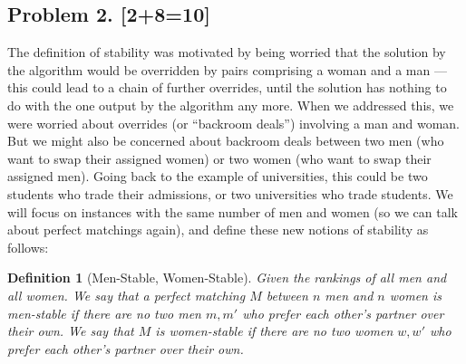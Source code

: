 \documentclass[10pt]{article}
\newtheorem{definition}{Definition}
\begin{document}
\subsection*{Problem 2. [2+8=10]}
  The definition of stability was motivated by being worried that the solution by the algorithm would be overridden by pairs comprising a woman and a man --- this could lead to a chain of further overrides, until the solution has nothing to do with the one output by the algorithm any more.
  When we addressed this, we were worried about overrides (or ``backroom deals'') involving a man and woman. But we might also be concerned about backroom deals between two men (who want to swap their assigned women) or two women (who want to swap their assigned men).
  Going back to the example of universities, this could be two students who trade their admissions, or two universities who trade students.
  We will focus on instances with the same number of men and women (so we can talk about perfect matchings again), and define these new notions of stability as follows:

  \begin{definition}[Men-Stable, Women-Stable]
     Given the rankings of all men and all women.
     We say that a perfect matching $M$ between $n$ men and $n$ women is \emph{men-stable} if there are no two men $m,m'$ who prefer each other's partner over their own.
     We say that $M$ is \emph{women-stable} if there are no two women $w,w'$ who prefer each other's partner over their own.
  \end{definition}
\end{document}
